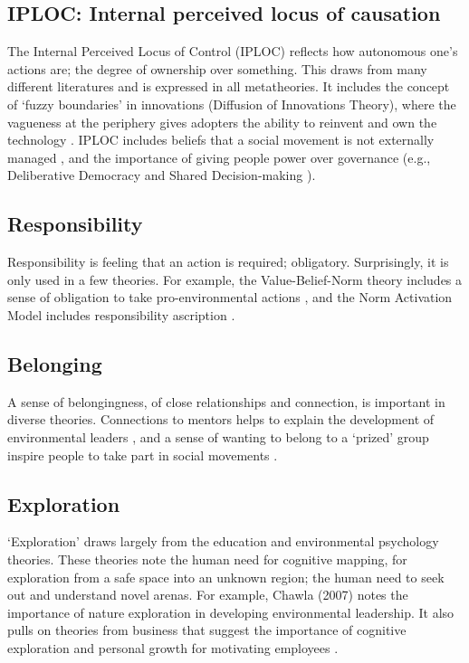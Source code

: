 \documentclass[12 pt]{article}
\begin{document}
		\subsection{IPLOC: Internal perceived locus of causation}
		The Internal Perceived Locus of Control (IPLOC) \parencite{DeCharms1968} reflects how autonomous one's actions are; the degree of ownership over something. This draws from many different literatures and is expressed in all metatheories. It includes the concept of `fuzzy boundaries' in innovations (Diffusion of Innovations Theory), where the vagueness at the periphery gives adopters the ability to reinvent and own the technology \parencite{Greenhalgh2004}. IPLOC includes beliefs that a social movement is not externally managed \parencite{Polletta1998}, and the importance of giving people power over governance (e.g., Deliberative Democracy \parencite{Miller1992, John2009} and Shared Decision-making \parencite{Weiss1995}). 
		\subsection{Responsibility}
		Responsibility is feeling that an action is required; obligatory. Surprisingly, it is only used in a few theories. For example, the Value-Belief-Norm theory includes a sense of obligation to take pro-environmental actions \parencite{Stern2000}, and the Norm Activation Model includes responsibility ascription \parencite{Schwartz1977}.
		\subsection{Belonging}
		A sense of belongingness, of close relationships and connection, is important in diverse theories. Connections to mentors helps to explain the development of environmental leaders \parencite{Chawla2007}, and a sense of wanting to belong to a `prized' group inspire people to take part in social movements \parencite{Oberschall1989,Polletta1998}. 
		\subsection{Exploration}
		`Exploration' draws largely from the education and environmental psychology theories. These theories note the human need for cognitive mapping, for exploration from a safe space into an unknown region; the human need to seek out and understand novel arenas. For example, Chawla (2007) notes the importance of nature exploration in developing environmental leadership. It also pulls on theories from business that suggest the importance of cognitive exploration and personal growth for motivating employees \parencite{Herzberg1968}. 
\end{document}
